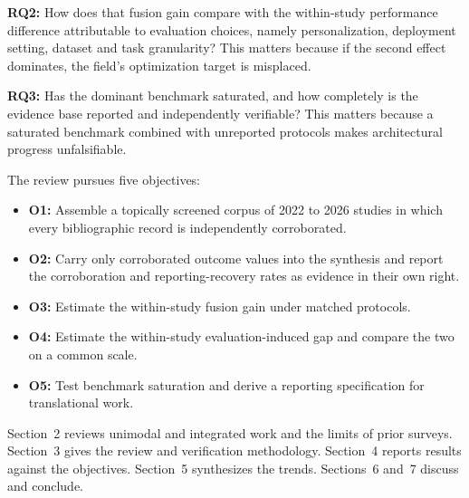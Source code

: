 \textbf{RQ2:} How does that fusion gain compare with the within-study performance difference
attributable to evaluation choices, namely personalization, deployment setting, dataset and
task granularity? This matters because if the second effect dominates, the field's
optimization target is misplaced.

\textbf{RQ3:} Has the dominant benchmark saturated, and how completely is the evidence base
reported and independently verifiable? This matters because a saturated benchmark combined
with unreported protocols makes architectural progress unfalsifiable.

The review pursues five objectives:
\begin{itemize}[leftmargin=1.25em,itemsep=1pt,topsep=2pt]
\item \textbf{O1:} Assemble a topically screened corpus of 2022 to 2026 studies in which every
      bibliographic record is independently corroborated.
\item \textbf{O2:} Carry only corroborated outcome values into the synthesis and report the
      corroboration and reporting-recovery rates as evidence in their own right.
\item \textbf{O3:} Estimate the within-study fusion gain under matched protocols.
\item \textbf{O4:} Estimate the within-study evaluation-induced gap and compare the two on a
      common scale.
\item \textbf{O5:} Test benchmark saturation and derive a reporting specification for
      translational work.
\end{itemize}

Section~2 reviews unimodal and integrated work and the limits of prior surveys. Section~3
gives the review and verification methodology. Section~4 reports results against the
objectives. Section~5 synthesizes the trends. Sections~6 and~7 discuss and conclude.
